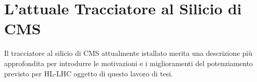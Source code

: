 




\section{L'attuale Tracciatore al Silicio di CMS}
\label{sec:tracciatore}
Il tracciatore al silicio di CMS attualmente istallato merita una descrizione pi\`u approfondita per introdurre le motivazioni e i miglioramenti del potenziamento previsto per HL-LHC oggetto di questo lavoro di tesi.

